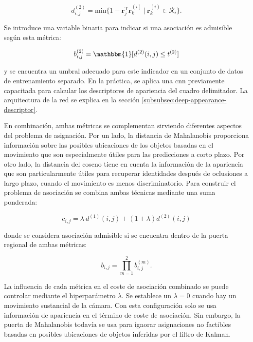 \begin{equation}
\label{eq:equation3-deepsort}
d_{i,j}^{(2)} = \text{min} \{1 - \boldsymbol{r}_{j}^{\text{T}} \boldsymbol{r}_{k}^{(i)} \ | \ \boldsymbol{r}_{k}^{(i)} \in \mathcal{R}_{i} \}.
\end{equation}

Se introduce una variable binaria para indicar si una asociación es admisible según esta métrica:

\begin{equation}
\label{eq:equation4-deepsort}
b_{i,j}^{(2)} = \mathbbm{1}[d^{(2)} (i,j) \leq t^{(2)}]
\end{equation}

y se encuentra un umbral adecuado para este indicador en un conjunto de datos de entrenamiento separado. En la práctica, se aplica una \gls{cnn} previamente capacitada para calcular los descriptores de apariencia del cuadro delimitador. La arquitectura de la red se explica en la sección \ref{subsubsec:deep-appearance-descriptor}.

En combinación, ambas métricas se complementan sirviendo diferentes aspectos del problema de asignación. Por un lado, la distancia de Mahalanobis proporciona información sobre las posibles ubicaciones de los objetos basadas en el movimiento que son especialmente útiles para las predicciones a corto plazo. Por otro lado, la distancia del coseno tiene en cuenta la información de la apariencia que son particularmente útiles para recuperar identidades después de oclusiones a largo plazo, cuando el movimiento es menos discriminatorio. Para construir el problema de asociación se combina ambas técnicas mediante una suma ponderada:

\begin{equation}
\label{eq:equation5-deepsort}
c_{i,j} = \lambda \ d^{(1)}(i,j) + (1 + \lambda)d^{(2)}(i,j)
\end{equation}

donde se considera asociación admisible si se encuentra dentro de la puerta regional de ambas métricas:

\begin{equation}
\label{eq:equation6-deepsort}
b_{i,j} = \prod_{m=1}^{2} b_{i,j}^{(m)}.
\end{equation}

La influencia de cada métrica en el coste de asociación combinado se puede controlar mediante el hiperparámetro $\lambda$. Se establece un $\lambda = 0$ cuando hay un movimiento sustancial de la cámara. Con esta configuración solo se usa información de apariencia en el término de coste de asociación. Sin embargo, la puerta de Mahalanobis todavía se usa para ignorar asignaciones no factibles basadas en posibles ubicaciones de objetos inferidas por el filtro de Kalman.

